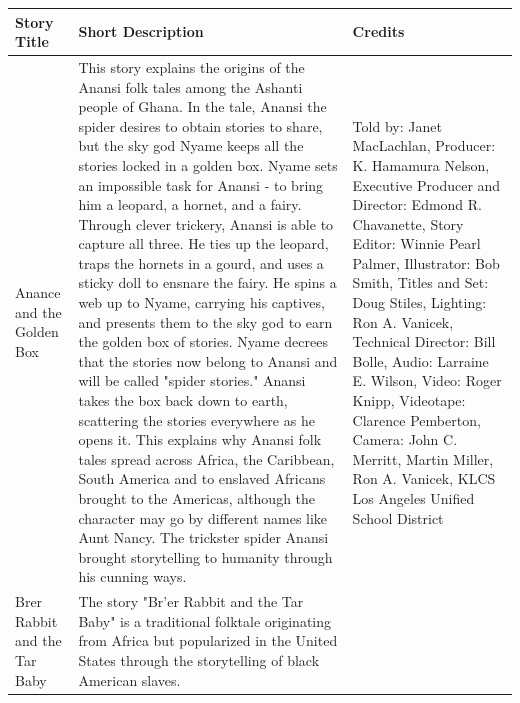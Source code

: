 \begin{table}[h]
    \centering
    \begin{small}

        \begin{tabular}{|p{1.5cm}|p{8.5cm}|p{7cm}|}
            \hline
            \textbf{Story Title} & \textbf{Short Description} & \textbf{Credits} \\
            \hline
            Anance and the Golden Box
                                 &
            This story explains the origins of the Anansi folk tales among the Ashanti people of Ghana.
            In the tale, Anansi the spider desires to obtain stories to share, but the sky god Nyame keeps all the stories locked in a golden box.
            Nyame sets an impossible task for Anansi - to bring him a leopard, a hornet, and a fairy.
            Through clever trickery, Anansi is able to capture all three.
            He ties up the leopard, traps the hornets in a gourd, and uses a sticky doll to ensnare the fairy.
            He spins a web up to Nyame, carrying his captives, and presents them to the sky god to earn the golden box of stories.
            Nyame decrees that the stories now belong to Anansi and will be called "spider stories."
            Anansi takes the box back down to earth, scattering the stories everywhere as he opens it.
            This explains why Anansi folk tales spread across Africa, the Caribbean, South America and to enslaved Africans brought to the Americas, although the character may go by different names like Aunt Nancy.
            The trickster spider Anansi brought storytelling to humanity through his cunning ways.
                                 &
            Told by: Janet MacLachlan,
            Producer: K. Hamamura Nelson,
            Executive Producer and Director: Edmond R. Chavanette,
            Story Editor: Winnie Pearl Palmer,
            Illustrator: Bob Smith,
            Titles and Set: Doug Stiles,
            Lighting: Ron A. Vanicek,
            Technical Director: Bill Bolle,
            Audio: Larraine E. Wilson,
            Video: Roger Knipp,
            Videotape: Clarence Pemberton,
            Camera: John C. Merritt, Martin Miller, Ron A. Vanicek,
            KLCS Los Angeles Unified School District
            \\
            \hline
            Brer Rabbit and the Tar Baby
                                 &
            The story "Br'er Rabbit and the Tar Baby" is a traditional folktale originating from Africa but popularized in the United States through the storytelling of black American slaves.

\end{tabular}
\end{small}
\end{table}
